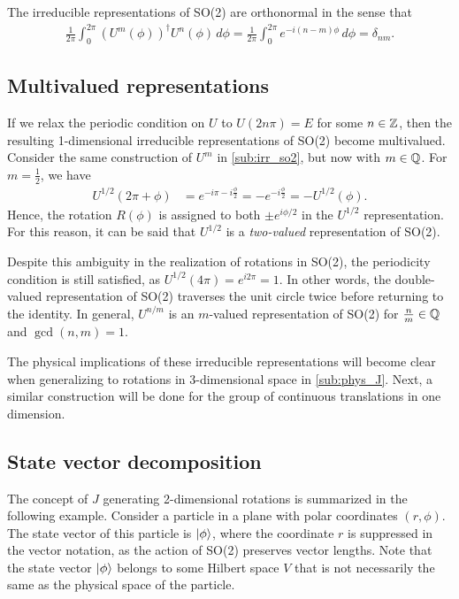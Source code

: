     The irreducible representations of SO(2) are orthonormal in the sense that
    \begin{align*}
        \frac{1}{2\pi}\int_{0}^{2\pi}{(U^m(\phi))}^\dagger U^n(\phi) \,d\phi = \frac{1}{2\pi}\int_{0}^{2\pi} e^{-i(n-m)\phi} \,d\phi = \delta_{nm}.
    \end{align*}

    \subsection{Multivalued representations}
    If we relax the periodic condition on $U$ to $U(2n\pi) = E$ for some $n\in\mathbb{Z}$, then the resulting 1-dimensional irreducible representations of SO(2) become multivalued. Consider the same construction of $U^m$ in \cref{sub:irr_so2}, but now with $m\in\mathbb{Q}$. For $m=\frac{1}{2}$, we have
    \begin{align*}
        U^{1/2}(2\pi + \phi) &= e^{-i\pi -i\frac{\phi}{2}} = -e^{-i\frac{\phi}{2}} = -U^{1/2}(\phi).
    \end{align*}
    Hence, the rotation $R(\phi)$ is assigned to both $\pm e^{i\phi/2}$ in the $U^{1/2}$ representation. For this reason, it can be said that $U^{1/2}$ is a \textit{two-valued} representation of SO(2).
    
    Despite this ambiguity in the realization of rotations in SO(2), the periodicity condition is still satisfied, as $U^{1/2}(4\pi) = e^{i2\pi} = 1$. In other words, the double-valued representation of SO(2) traverses the unit circle twice before returning to the identity. In general, $U^{n/m}$ is an $m$-valued representation of SO(2) for $\frac{n}{m}\in\mathbb{Q}$ and $\gcd(n,m)=1$.
    
    The physical implications of these irreducible representations will become clear when generalizing to rotations in 3-dimensional space in \cref{sub:phys_J}. Next, a similar construction will be done for the group of continuous translations in one dimension.

    \subsection{State vector decomposition}\label{sub:SO2_decomp}
    The concept of $J$ generating 2-dimensional rotations is summarized in the following example. Consider a particle in a plane with polar coordinates $(r,\phi)$. The state vector of this particle is $\ket{\phi}$, where the coordinate $r$ is suppressed in the vector notation, as the action of SO(2) preserves vector lengths. Note that the state vector $\ket{\phi}$ belongs to some Hilbert space $V$ that is not necessarily the same as the physical space of the particle.
    
